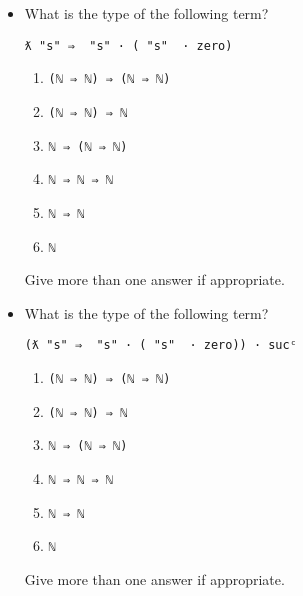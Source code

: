 \begin{itemize}
\item
  What is the type of the following term?

  \texttt{ƛ\ "s"\ ⇒\ \textasciigrave{}\ "s"\ ·\ (\textasciigrave{}\ "s"\ \ ·\ \textasciigrave{}zero)}

  \begin{enumerate}
  \def\labelenumi{\arabic{enumi}.}
  \tightlist
  \item
    \texttt{(\textasciigrave{}ℕ\ ⇒\ \textasciigrave{}ℕ)\ ⇒\ (\textasciigrave{}ℕ\ ⇒\ \textasciigrave{}ℕ)}
  \item
    \texttt{(\textasciigrave{}ℕ\ ⇒\ \textasciigrave{}ℕ)\ ⇒\ \textasciigrave{}ℕ}
  \item
    \texttt{\textasciigrave{}ℕ\ ⇒\ (\textasciigrave{}ℕ\ ⇒\ \textasciigrave{}ℕ)}
  \item
    \texttt{\textasciigrave{}ℕ\ ⇒\ \textasciigrave{}ℕ\ ⇒\ \textasciigrave{}ℕ}
  \item
    \texttt{\textasciigrave{}ℕ\ ⇒\ \textasciigrave{}ℕ}
  \item
    \texttt{\textasciigrave{}ℕ}
  \end{enumerate}

  Give more than one answer if appropriate.
\item
  What is the type of the following term?

  \texttt{(ƛ\ "s"\ ⇒\ \textasciigrave{}\ "s"\ ·\ (\textasciigrave{}\ "s"\ \ ·\ \textasciigrave{}zero))\ ·\ sucᶜ}

  \begin{enumerate}
  \def\labelenumi{\arabic{enumi}.}
  \tightlist
  \item
    \texttt{(\textasciigrave{}ℕ\ ⇒\ \textasciigrave{}ℕ)\ ⇒\ (\textasciigrave{}ℕ\ ⇒\ \textasciigrave{}ℕ)}
  \item
    \texttt{(\textasciigrave{}ℕ\ ⇒\ \textasciigrave{}ℕ)\ ⇒\ \textasciigrave{}ℕ}
  \item
    \texttt{\textasciigrave{}ℕ\ ⇒\ (\textasciigrave{}ℕ\ ⇒\ \textasciigrave{}ℕ)}
  \item
    \texttt{\textasciigrave{}ℕ\ ⇒\ \textasciigrave{}ℕ\ ⇒\ \textasciigrave{}ℕ}
  \item
    \texttt{\textasciigrave{}ℕ\ ⇒\ \textasciigrave{}ℕ}
  \item
    \texttt{\textasciigrave{}ℕ}
  \end{enumerate}

  Give more than one answer if appropriate.
\end{itemize}

